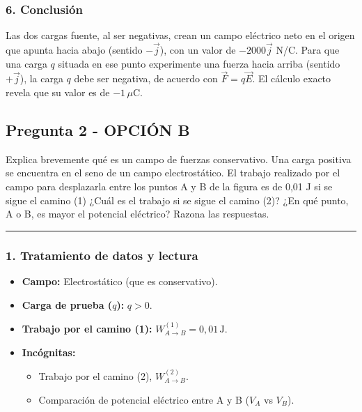 \subsubsection*{6. Conclusión}
\begin{cajaconclusion}
Las dos cargas fuente, al ser negativas, crean un campo eléctrico neto en el origen que apunta hacia abajo (sentido $-\vec{j}$), con un valor de $-2000\vec{j}$ N/C. Para que una carga $q$ situada en ese punto experimente una fuerza hacia arriba (sentido $+\vec{j}$), la carga $q$ debe ser negativa, de acuerdo con $\vec{F}=q\vec{E}$. El cálculo exacto revela que su valor es de $-1\,\mu\text{C}$.
\end{cajaconclusion}

\newpage

\subsection{Pregunta 2 - OPCIÓN B}
\label{subsec:2B_2019_jul_ext}
\begin{cajaenunciado}
Explica brevemente qué es un campo de fuerzas conservativo. Una carga positiva se encuentra en el seno de un campo electrostático. El trabajo realizado por el campo para desplazarla entre los puntos A y B de la figura es de 0,01 J si se sigue el camino (1) ¿Cuál es el trabajo si se sigue el camino (2)? ¿En qué punto, A o B, es mayor el potencial eléctrico? Razona las respuestas.
\end{cajaenunciado}
\hrule

\subsubsection*{1. Tratamiento de datos y lectura}
\begin{itemize}
    \item \textbf{Campo:} Electrostático (que es conservativo).
    \item \textbf{Carga de prueba ($q$):} $q > 0$.
    \item \textbf{Trabajo por el camino (1):} $W_{A \to B}^{(1)} = 0,01 \, \text{J}$.
    \item \textbf{Incógnitas:}
    \begin{itemize}
        \item Trabajo por el camino (2), $W_{A \to B}^{(2)}$.
        \item Comparación de potencial eléctrico entre A y B ($V_A$ vs $V_B$).
    \end{itemize}
\end{itemize}

